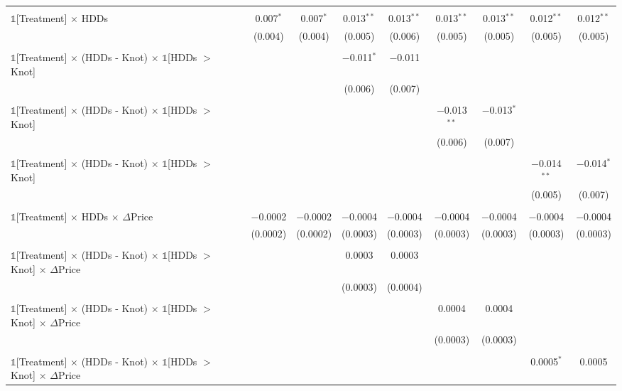 \begin{table}[!htbp]
\begin{longtable}{@{\extracolsep{0pt}}lcccccccc}
  & & & & & & & & \\ 
 $\mathbb{1}$[Treatment] $\times$ HDDs & 0.007$^{*}$ & 0.007$^{*}$ & 0.013$^{**}$ & 0.013$^{**}$ & 0.013$^{**}$ & 0.013$^{**}$ & 0.012$^{**}$ & 0.012$^{**}$ \\ 
  & (0.004) & (0.004) & (0.005) & (0.006) & (0.005) & (0.005) & (0.005) & (0.005) \\ 
  & & & & & & & & \\ 
 $\mathbb{1}$[Treatment] $\times$ (HDDs - Knot) $\times$ $\mathbb{1}$[HDDs $>$ Knot] &  &  & $-$0.011$^{*}$ & $-$0.011 &  &  &  &  \\ 
  &  &  & (0.006) & (0.007) &  &  &  &  \\ 
  & & & & & & & & \\ 
 $\mathbb{1}$[Treatment] $\times$ (HDDs - Knot) $\times$ $\mathbb{1}$[HDDs $>$ Knot] &  &  &  &  & $-$0.013$^{**}$ & $-$0.013$^{*}$ &  &  \\ 
  &  &  &  &  & (0.006) & (0.007) &  &  \\ 
  & & & & & & & & \\ 
 $\mathbb{1}$[Treatment] $\times$ (HDDs - Knot) $\times$ $\mathbb{1}$[HDDs $>$ Knot] &  &  &  &  &  &  & $-$0.014$^{**}$ & $-$0.014$^{*}$ \\ 
  &  &  &  &  &  &  & (0.005) & (0.007) \\ 
  & & & & & & & & \\ 
 $\mathbb{1}$[Treatment] $\times$ HDDs $\times$ $\Delta$Price & $-$0.0002 & $-$0.0002 & $-$0.0004 & $-$0.0004 & $-$0.0004 & $-$0.0004 & $-$0.0004 & $-$0.0004 \\ 
  & (0.0002) & (0.0002) & (0.0003) & (0.0003) & (0.0003) & (0.0003) & (0.0003) & (0.0003) \\ 
  & & & & & & & & \\ 
 $\mathbb{1}$[Treatment] $\times$ (HDDs - Knot) $\times$ $\mathbb{1}$[HDDs $>$ Knot] $\times$ $\Delta$Price &  &  & 0.0003 & 0.0003 &  &  &  &  \\ 
  &  &  & (0.0003) & (0.0004) &  &  &  &  \\ 
  & & & & & & & & \\ 
 $\mathbb{1}$[Treatment] $\times$ (HDDs - Knot) $\times$ $\mathbb{1}$[HDDs $>$ Knot] $\times$ $\Delta$Price &  &  &  &  & 0.0004 & 0.0004 &  &  \\ 
  &  &  &  &  & (0.0003) & (0.0003) &  &  \\ 
  & & & & & & & & \\ 
 $\mathbb{1}$[Treatment] $\times$ (HDDs - Knot) $\times$ $\mathbb{1}$[HDDs $>$ Knot] $\times$ $\Delta$Price &  &  &  &  &  &  & 0.0005$^{*}$ & 0.0005 \\ 

\end{longtable}
\end{table}
